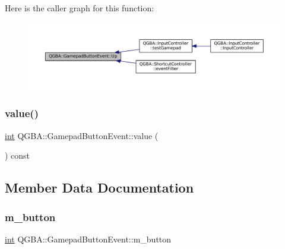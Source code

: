 Here is the caller graph for this function\+:
\nopagebreak
\begin{figure}[H]
\begin{center}
\leavevmode
\includegraphics[width=350pt]{class_q_g_b_a_1_1_gamepad_button_event_a27a05c5199de66a176c87c9c3589b909_icgraph}
\end{center}
\end{figure}
\mbox{\label{class_q_g_b_a_1_1_gamepad_button_event_a4369eaa63562f97f264c45463b3d9a18}} 
\subsubsection{\texorpdfstring{value()}{value()}}
{\footnotesize\ttfamily \mbox{\hyperlink{ioapi_8h_a787fa3cf048117ba7123753c1e74fcd6}{int}} Q\+G\+B\+A\+::\+Gamepad\+Button\+Event\+::value (\begin{DoxyParamCaption}{ }\end{DoxyParamCaption}) const\hspace{0.3cm}{\ttfamily [inline]}}



\subsection{Member Data Documentation}
\mbox{\label{class_q_g_b_a_1_1_gamepad_button_event_a15552eaf205bb13dd21b430ab6b6d661}} 
\subsubsection{\texorpdfstring{m\+\_\+button}{m\_button}}
{\footnotesize\ttfamily \mbox{\hyperlink{ioapi_8h_a787fa3cf048117ba7123753c1e74fcd6}{int}} Q\+G\+B\+A\+::\+Gamepad\+Button\+Event\+::m\+\_\+button\hspace{0.3cm}{\ttfamily [private]}}

